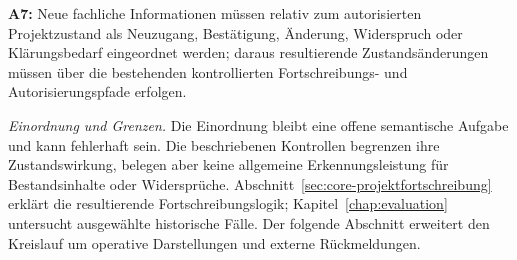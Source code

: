 \textbf{A7:} Neue fachliche Informationen müssen relativ zum
autorisierten Projektzustand als Neuzugang, Bestätigung, Änderung,
Widerspruch oder Klärungsbedarf eingeordnet werden; daraus resultierende
Zustandsänderungen müssen über die bestehenden kontrollierten
Fortschreibungs- und Autorisierungspfade erfolgen.

\emph{Einordnung und Grenzen.} Die Einordnung bleibt eine offene
semantische Aufgabe und kann fehlerhaft sein. Die beschriebenen
Kontrollen begrenzen ihre Zustandswirkung, belegen aber keine
allgemeine Erkennungsleistung für Bestandsinhalte oder Widersprüche.
Abschnitt~\ref{sec:core-projektfortschreibung} erklärt die resultierende
Fortschreibungslogik; Kapitel~\ref{chap:evaluation} untersucht
ausgewählte historische Fälle. Der folgende Abschnitt erweitert den
Kreislauf um operative Darstellungen und externe Rückmeldungen.
